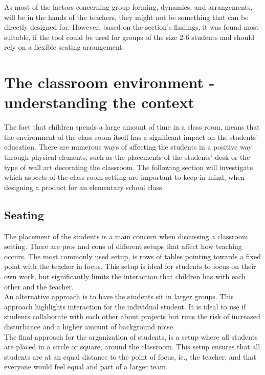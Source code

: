 As most of the factors concerning group forming, dynamics, and arrangements,  will be in the hands of the teachers, they might not be something that can be directly designed for.  
However, based on the section's findings, it was found most suitable, if the tool could be used for groups of the size 2-6 students and should rely on a flexible seating arrangement.
 

\section{The classroom environment -understanding the context} %


The fact that children spends a large amount of time in a class room, means that the environment of the class room itself has a significant impact on the students’ education. There are numerous ways of affecting the students in a positive way through physical elements, such as the placements of the students’ desk or the type of wall art decorating the classroom.\cite{classroomsetting} The following section will investigate which aspects of the class room setting are important to keep in mind, when designing a product for an elementary school class.\\

\subsection{Seating}
The placement of the students is a main concern when discussing a classroom setting. There are pros and cons of different setups that affect how teaching occurs.
The most commonly used setup, is rows of tables pointing towards a fixed point with the teacher in focus. This setup is ideal for students to focus on their own work, but significantly limits the interaction that children has with each other and the teacher.\cite{classroomsetting} \\

An alternative approach is to have the students sit in larger groups. This approach highlights interaction for the individual student. It is ideal to use if students collaborate with each other about projects but runs the risk of increased disturbance and a higher amount of background noise.\cite{classroomsetting}\\

The final approach for the organization of students, is a setup where all students are placed in a circle or square, around the classroom. This setup ensures that all students are at an equal distance to the point of focus, ie., the teacher, and that everyone would feel equal and part of a larger team.\cite{classroomsetting}\\

